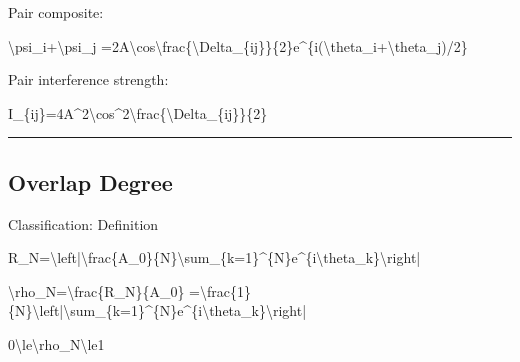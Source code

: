 \documentclass[
  a4paper]{article}
\newenvironment{Shaded}{}{}
\newcommand{\NormalTok}[1]{#1}
\begin{document}
Pair composite:

\begin{Shaded}
\begin{Highlighting}[]
\NormalTok{\textbackslash{}psi\_i+\textbackslash{}psi\_j}
\NormalTok{=2A\textbackslash{}cos\textbackslash{}frac\{\textbackslash{}Delta\_\{ij\}\}\{2\}e\^{}\{i(\textbackslash{}theta\_i+\textbackslash{}theta\_j)/2\}}
\end{Highlighting}
\end{Shaded}

Pair interference strength:

\begin{Shaded}
\begin{Highlighting}[]
\NormalTok{I\_\{ij\}=4A\^{}2\textbackslash{}cos\^{}2\textbackslash{}frac\{\textbackslash{}Delta\_\{ij\}\}\{2\}}
\end{Highlighting}
\end{Shaded}

\begin{center}\rule{0.5\linewidth}{0.5pt}\end{center}

\subsection{Overlap Degree}\label{overlap-degree}

Classification: Definition

\begin{Shaded}
\begin{Highlighting}[]
\NormalTok{R\_N=\textbackslash{}left|\textbackslash{}frac\{A\_0\}\{N\}\textbackslash{}sum\_\{k=1\}\^{}\{N\}e\^{}\{i\textbackslash{}theta\_k\}\textbackslash{}right|}
\end{Highlighting}
\end{Shaded}

\begin{Shaded}
\begin{Highlighting}[]
\NormalTok{\textbackslash{}rho\_N=\textbackslash{}frac\{R\_N\}\{A\_0\}}
\NormalTok{=\textbackslash{}frac\{1\}\{N\}\textbackslash{}left|\textbackslash{}sum\_\{k=1\}\^{}\{N\}e\^{}\{i\textbackslash{}theta\_k\}\textbackslash{}right|}
\end{Highlighting}
\end{Shaded}

\begin{Shaded}
\begin{Highlighting}[]
\NormalTok{0\textbackslash{}le\textbackslash{}rho\_N\textbackslash{}le1}
\end{Highlighting}
\end{Shaded}
\end{document}
